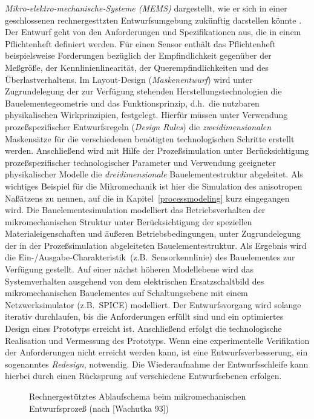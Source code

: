 {\em Mikro-elektro-mechanische-Systeme (MEMS)}
dargestellt, wie er sich in einer geschlossenen rechnergesttzten
Entwurfsumgebung zukünftig darstellen könnte \cite{Wac93}.
Der Entwurf geht von
den Anforderungen und Spezifikationen aus, die in einem Pflichtenheft
definiert werden. Für einen Sensor enthält das Pflichtenheft
beispielsweise Forderungen bezüglich der Empfindlichkeit gegenüber der
Meßgröße, der Kennlinienlinearität, der Querempfindlichkeiten und des
Überlastverhaltens. Im Layout-Design ({\sl Maskenentwurf}) wird unter
Zugrundelegung der zur Verfügung stehenden Herstellungstechnologien die
Bauelementegeometrie und das Funktionsprinzip, d.h.\ die nutzbaren
physikalischen Wirkprinzipien, festgelegt. Hierfür müssen unter Verwendung
prozeßspezifischer Entwurfsregeln ({\sl Design Rules}) die
{\em zweidimensionalen}
Maskensätze für die verschiedenen benötigten technologischen Schritte
erstellt werden.
%
Anschließend wird mit Hilfe der Prozeßsimulation unter Berücksichtigung
prozeßspezifischer technologischer Parameter und Verwendung geeigneter
physikalischer Modelle die {\em dreidimensionale} Bauelementestruktur
abgeleitet. Als wichtiges Beispiel für die Mikromechanik ist hier die
Simulation des anisotropen Naßätzens zu nennen, auf die in
Kapitel~\ref{processmodeling} kurz eingegangen wird.
%
Die Bauelementesimulation modelliert das Betriebsverhalten
der mikromechanischen Struktur unter Berücksichtigung der speziellen
Materialeigenschaften und äußeren Betriebsbedingungen, unter Zugrundelegung
der in der Prozeßsimulation abgeleiteten Bauelementestruktur. Als Ergebnis
wird die \glqq Ein-/Ausgabe-Charakteristik\grqq \, (z.B.\ Sensorkennlinie)
des Bauelementes zur Verfügung gestellt.
%
Auf einer nächst höheren Modellebene wird das Systemverhalten ausgehend von
dem elektrischen Ersatzschaltbild des mikromechanischen Bauelementes auf
Schaltungsebene mit einem Netzwerksimulator (z.B.\ {\sf SPICE})
modelliert. Der Entwurfsvorgang wird solange iterativ durchlaufen, bis
die Anforderungen erfüllt sind und ein optimiertes Design eines
Prototyps erreicht ist. Anschließend erfolgt die technologische
Realisation und Vermessung des Prototyps. Wenn eine experimentelle
Verifikation der Anforderungen nicht erreicht werden kann, ist eine
Entwurfsverbesserung, ein sogenanntes {\em Redesign}, notwendig. Die
Wiederaufnahme der Entwurfsschleife kann hierbei durch einen Rücksprung
auf verschiedene Entwurfsebenen erfolgen.
\begin{figure}[htb]
\begin{center}

\setabbee
\end{center}
\caption{\label{abbmems}
 Rechnergestütztes Ablaufschema beim mikromechanischen Entwurfsprozeß
 (nach [Wachutka 93])}
\end{figure}

